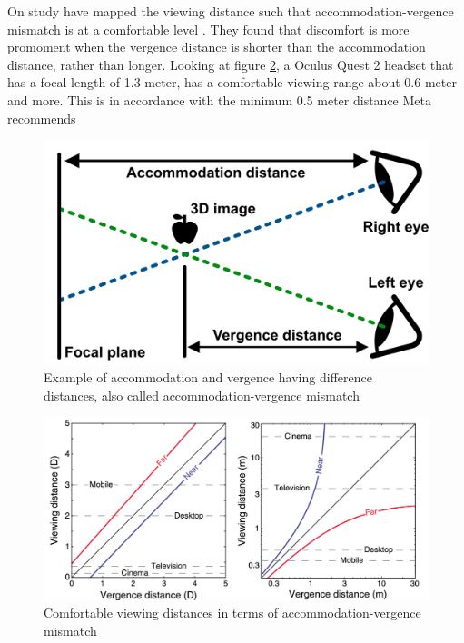 \documentclass{sigchi}
\begin{document}
On study have mapped the viewing distance such that accommodation-vergence mismatch is at a comfortable level \cite{shibata_zone_2011}. They found that discomfort is more promoment when the vergence distance is shorter than the accommodation distance, rather than longer. Looking at figure \ref{fig:comfort_viewing_diagram}, a Oculus Quest 2 headset that has a focal length of 1.3 meter, has a comfortable viewing range about 0.6 meter and more. This is in accordance with the minimum 0.5 meter distance Meta recommends \cite{noauthor_vision_nodate}

\begin{figure}[h]
  \includegraphics[width=\linewidth]{figures/AccommodationVergenceConflict.png}
  \caption{Example of accommodation and vergence having difference distances, also called accommodation-vergence mismatch}
  \label{fig:accommodation_vergence_conflict}
\end{figure}

\begin{figure}[h]
  \includegraphics[width=\linewidth]{figures/ComfortViewingDiagram.png}
  \caption{Comfortable viewing distances in terms of accommodation-vergence mismatch}
  \label{fig:comfort_viewing_diagram}
\end{figure}
\end{document}

